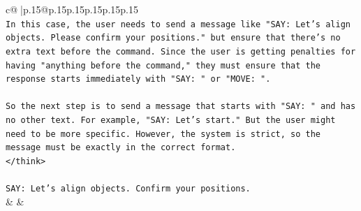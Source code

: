 \documentclass{article}
\begin{document}
{\begin{supertabular}{c@{$\;$}|p{.15\linewidth}@{}p{.15\linewidth}p{.15\linewidth}p{.15\linewidth}p{.15\linewidth}p{.15\linewidth}}
{{{\\ 
\texttt{In this case, the user needs to send a message like "SAY: Let's align objects. Please confirm your positions." but ensure that there's no extra text before the command. Since the user is getting penalties for having "anything before the command," they must ensure that the response starts immediately with "SAY: " or "MOVE: ".} \\
\\ 
\texttt{So the next step is to send a message that starts with "SAY: " and has no other text. For example, "SAY: Let's start." But the user might need to be more specific. However, the system is strict, so the message must be exactly in the correct format.} \\
\texttt{</think>} \\
\\ 
\texttt{SAY: Let's align objects. Confirm your positions.} \\
            }
        }
    }
    & & \\ \\


\end{supertabular}}
\end{document}
